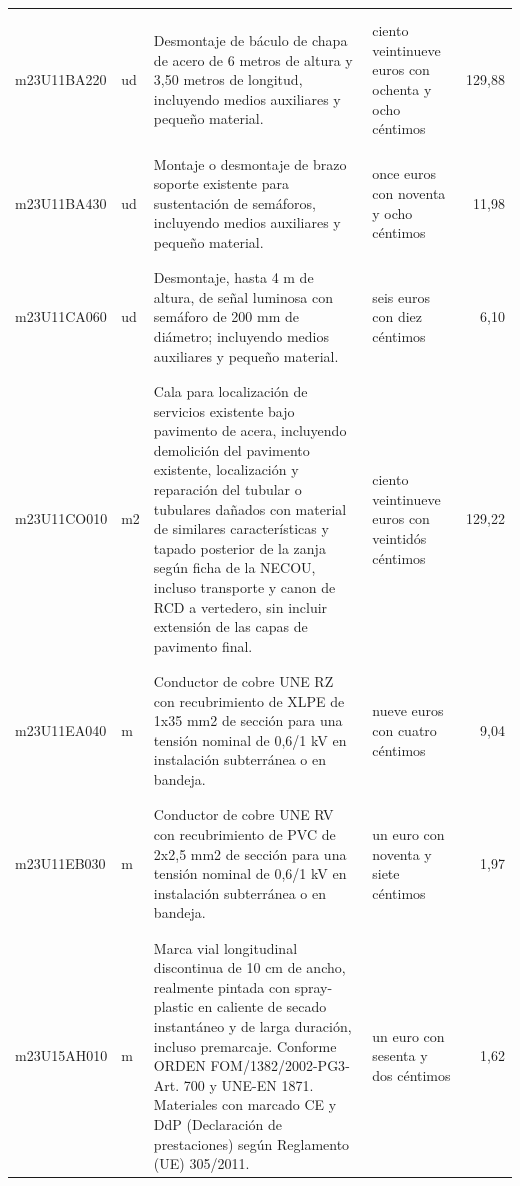 \documentclass{book}%
\begin{document}
\begin{supertabular}{|l|l|p{5cm}|p{3cm}|r|}
&&&&\\%
&&&&\\%
m23U11BA220&ud&Desmontaje de báculo de chapa de acero de 6 metros de altura y 3,50 metros de longitud, incluyendo medios auxiliares y pequeño material.&ciento veintinueve euros con ochenta y ocho céntimos&129,88\\%
&&&&\\%
&&&&\\%
m23U11BA430&ud&Montaje o desmontaje de brazo soporte existente para sustentación de semáforos, incluyendo medios auxiliares y pequeño material.&once euros con noventa y ocho céntimos&11,98\\%
&&&&\\%
&&&&\\%
m23U11CA060&ud&Desmontaje, hasta 4 m de altura, de señal luminosa con semáforo de 200 mm de diámetro; incluyendo medios auxiliares y pequeño material.&seis euros con diez céntimos&6,10\\%
&&&&\\%
&&&&\\%
m23U11CO010&m2&Cala para localización de servicios existente bajo pavimento de acera, incluyendo demolición del pavimento existente, localización y reparación del tubular o tubulares dañados con material de similares características y tapado posterior de la zanja según ficha de la NECOU, incluso transporte y canon de RCD a vertedero, sin incluir extensión de las capas de pavimento final.&ciento veintinueve euros con veintidós céntimos&129,22\\%
&&&&\\%
&&&&\\%
m23U11EA040&m&Conductor de cobre UNE RZ con recubrimiento de XLPE de 1x35 mm2 de sección para una tensión nominal de 0,6/1 kV en instalación subterránea o en bandeja.&nueve euros con cuatro céntimos&9,04\\%
&&&&\\%
&&&&\\%
m23U11EB030&m&Conductor de cobre UNE RV con recubrimiento de PVC de 2x2,5 mm2 de sección para una tensión nominal de 0,6/1 kV en instalación subterránea o en bandeja.&un euro con noventa y siete céntimos&1,97\\%
&&&&\\%
&&&&\\%
m23U15AH010&m&Marca vial longitudinal discontinua de 10 cm de ancho, realmente pintada con spray{-}plastic en caliente de secado instantáneo y de larga duración, incluso premarcaje. Conforme ORDEN FOM/1382/2002{-}PG3{-}Art. 700 y UNE{-}EN 1871. Materiales con marcado CE y DdP (Declaración de prestaciones) según Reglamento (UE) 305/2011.&un euro con sesenta y dos céntimos&1,62\\%

\end{supertabular}
\end{document}
